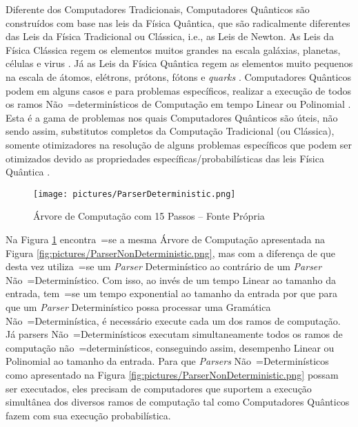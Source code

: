 {    Diferente dos Computadores Tradicionais,
    Computadores Quânticos são construídos com base nas leis da Física Quântica,
    que são radicalmente diferentes das Leis da Física Tradicional ou Clássica,
    i.e.,
    as Leis de Newton.
    As Leis da Física Clássica regem os elementos muitos grandes na escala galáxias,
    planetas, células e
    virus \cite{halliday2013fundamentals}.
    Já as Leis da Física Quântica regem as elementos muito pequenos na escala de átomos,
    elétrons, prótons, fótons e
    \textit{quarks} \cite{dicke1963QuantumPhysicsIntroduction}.
    Computadores Quânticos podem em alguns casos e
    para problemas específicos,
    realizar a execução de todos os ramos Não~=determinísticos de Computação em
    tempo Linear ou Polinomial \cite{theGoodAndBadQuantumComputing}.
    Esta é a gama de problemas nos quais Computadores Quânticos são úteis,
    não sendo assim,
    substitutos completos da Computação Tradicional (ou Clássica),
    somente otimizadores na resolução de alguns problemas específicos que
    podem ser otimizados devido as propriedades
    específicas\slash{}probabilísticas das leis Física Quântica
    \cite{churchTuringQuantumComputer}.
    \begin{figure}[H]
    \centering
    \texttt{[image: pictures/ParserDeterministic.png]}
    \caption{Árvore de Computação com 15 Passos -- Fonte Própria}
    \label{fig:pictures/ParserDeterministic.png}
    \end{figure}

    Na Figura \ref{fig:pictures/ParserDeterministic.png} encontra~=se a mesma Árvore de
    Computação apresentada na Figura \ref{fig:pictures/ParserNonDeterministic.png},
    mas com a diferença de que desta vez utiliza~=se um \textit{Parser}
    Determinístico ao contrário de um \textit{Parser} Não~=Determinístico.
    Com isso,
    ao invés de um tempo Linear ao tamanho da entrada,
    tem~=se um tempo exponential ao tamanho da entrada por que para que um \textit{Parser}
    Determinístico possa processar uma Gramática Não~=Determinística,
    é necessário execute cada um dos ramos de computação.
    Já parsers Não~=Determinísticos executam simultaneamente
    todos os ramos de computação não~=determinísticos,
    conseguindo assim,
    desempenho Linear ou Polinomial ao tamanho da entrada.
    Para que \textit{Parsers} Não~=Determinísticos como apresentado na Figura
    \ref{fig:pictures/ParserNonDeterministic.png} possam ser executados,
    eles precisam de computadores que suportem a execução simultânea dos diversos ramos de
    computação tal como Computadores Quânticos fazem com sua execução probabilística.
}

